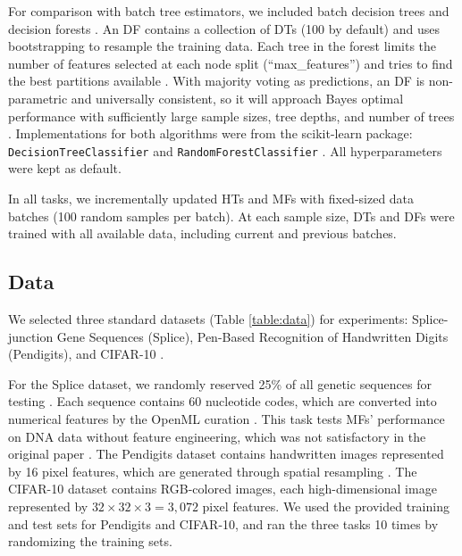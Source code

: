 For comparison with batch tree estimators, we included batch decision trees and decision forests \citep{breiman_random_2001}. An DF contains a collection of DTs (100 by default) and uses bootstrapping to resample the training data. Each tree in the forest limits the number of features selected at each node split (``max\_features'') and tries to find the best partitions available \citep{breiman_random_2001}.
With majority voting as predictions, an DF is non-parametric and universally consistent, so it will approach Bayes optimal performance with sufficiently large sample sizes, tree depths, and number of trees \citep{liaw_classification_2002, biau_consistency_2008}.
Implementations for both algorithms were from the scikit-learn package: \texttt{DecisionTreeClassifier} and \texttt{RandomForestClassifier} \citep{pedregosa_scikit-learn_2011}. All hyperparameters were kept as default.

In all tasks, we incrementally updated HTs and MFs with fixed-sized data batches (100 random samples per batch). At each sample size, DTs and DFs were trained with all available data, including current and previous batches. 

\subsection{Data}
We selected three standard datasets (Table \ref{table:data}) for experiments: Splice-junction Gene Sequences (Splice), Pen-Based Recognition of Handwritten Digits (Pendigits), and CIFAR-10 \citep{towell_molecular_1991, alpaydin_pen-based_1998, krizhevsky_learning_2012, lavanya_handwritten_2017}.

For the Splice dataset, we randomly reserved 25\% of all genetic sequences for testing \citep{rampone_splice-junction_1998, sarkar_splice_2020}. Each sequence contains 60 nucleotide codes, which are converted into numerical features by the OpenML curation \citep{feurer_openml-python_2019}. This task tests MFs' performance on DNA data without feature engineering, which was not satisfactory in the original paper \cite{lakshminarayanan_mondrian_2014}. 
The Pendigits dataset contains handwritten images represented by 16 pixel features, which are generated through spatial resampling \citep{alimoglu_methods_1996}.
The CIFAR-10 dataset contains RGB-colored images, each high-dimensional image represented by $32 \times 32 \times 3 = 3,072$ pixel features. We used the provided training and test sets for Pendigits and CIFAR-10, and ran the three tasks 10 times by randomizing the training sets. 


